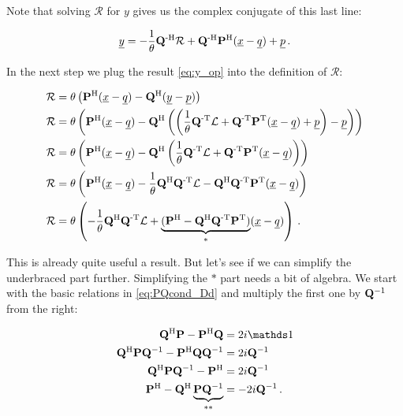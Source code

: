 Note that solving $\mathcal{R}$ for $y$ gives us the complex conjugate of this
last line:

\begin{equation}  \label{eq:y_op_cc}
  \underline{y} = -\frac{1}{\theta} \mathbf{Q}{}^{\textnormal{-H}} \mathcal{R} + \mathbf{Q}{}^{\textnormal{-H}} \mathbf{P}{}^{\textnormal{H}} (\underline{x}-\underline{q}) + \underline{p} \,.
\end{equation}

In the next step we plug the result \eqref{eq:y_op} into the definition of
$\mathcal{R}$:

\begin{align} \label{eq:loc_op_r}
  \mathcal{R} & = \theta \left( \mathbf{P}{}^{\textnormal{H}} (\underline{x}-\underline{q}) - \mathbf{Q}{}^{\textnormal{H}} (\underline{y}-\underline{p}) \right) \nonumber\\
  \mathcal{R} & = \theta \left( \mathbf{P}{}^{\textnormal{H}} (\underline{x}-\underline{q}) - \mathbf{Q}{}^{\textnormal{H}} \left(\left(
                  \frac{1}{\theta} \mathbf{Q}{}^{\textnormal{-T}} \mathcal{L} + \mathbf{Q}{}^{\textnormal{-T}} \mathbf{P}{}^{\textnormal{T}} (\underline{x}-\underline{q}) + \underline{p}
                  \right)-\underline{p}\right) \right) \nonumber\\
  \mathcal{R} & = \theta \left( \mathbf{P}{}^{\textnormal{H}} (\underline{x}-\underline{q}) - \mathbf{Q}{}^{\textnormal{H}} \left(
                  \frac{1}{\theta} \mathbf{Q}{}^{\textnormal{-T}} \mathcal{L} + \mathbf{Q}{}^{\textnormal{-T}} \mathbf{P}{}^{\textnormal{T}} (\underline{x}-\underline{q})
                  \right) \right) \nonumber\\
  \mathcal{R} & = \theta \left( \mathbf{P}{}^{\textnormal{H}} (\underline{x}-\underline{q})
                    - \frac{1}{\theta} \mathbf{Q}{}^{\textnormal{H}}\mathbf{Q}{}^{\textnormal{-T}} \mathcal{L}
                    - \mathbf{Q}{}^{\textnormal{H}}\mathbf{Q}{}^{\textnormal{-T}}\mathbf{P}{}^{\textnormal{T}} (\underline{x}-\underline{q})
                  \right) \nonumber\\
  \mathcal{R} & = \theta \left(
                    - \frac{1}{\theta} \mathbf{Q}{}^{\textnormal{H}}\mathbf{Q}{}^{\textnormal{-T}} \mathcal{L}
                    + \underbrace{(\mathbf{P}{}^{\textnormal{H}} - \mathbf{Q}{}^{\textnormal{H}}\mathbf{Q}{}^{\textnormal{-T}}\mathbf{P}{}^{\textnormal{T}})}_{*} (\underline{x}-\underline{q})
                  \right) \,.
\end{align}

This is already quite useful a result. But let's see if we can simplify the
underbraced part further. Simplifying the $*$ part needs a bit of algebra. We
start with the basic relations in \eqref{eq:PQcond_Dd} and multiply the first
one by $\mathbf{Q}{}^{-1}$ from the right:

\begin{align*}
  \mat{Q}\H \mat{P} - \mat{P}\H \mat{Q} & = 2i \id \\
  \mat{Q}\H \mat{P} \mat{Q}\inv - \mat{P}\H \mat{Q} \mat{Q}\inv & = 2i \mat{Q}\inv \\
  \mat{Q}\H \mat{P} \mat{Q}\inv - \mat{P}\H & = 2i \mat{Q}\inv \\
  \mat{P}\H - \mat{Q}\H \underbrace{\mat{P} \mat{Q}\inv}_{**} & = -2i \mat{Q}\inv \,.
\end{align*}

